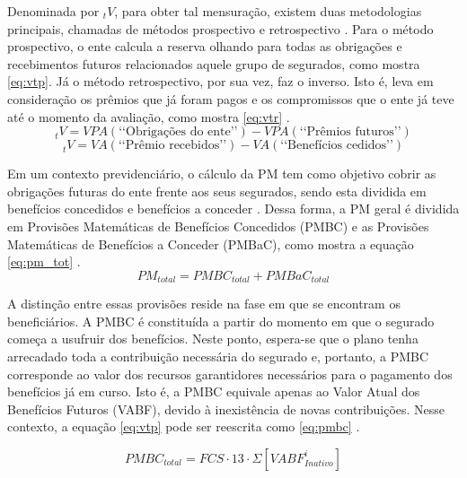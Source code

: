 Denominada por ${}_tV$, para obter tal mensuração, existem duas metodologias principais, chamadas de métodos prospectivo e retrospectivo \cite{cordeiro2014calculo, vilanoca1969, dickson2019}. Para o método prospectivo, o ente calcula a reserva olhando para todas as obrigações e recebimentos futuros relacionados aquele grupo de segurados, como mostra \ref{eq:vtp}. Já o método retrospectivo, por sua vez, faz o inverso. Isto é, leva em consideração os prêmios que já foram pagos e os compromissos que o ente já teve até o momento da avaliação, como mostra \ref{eq:vtr} \cite{bowers2006, jordan2003}.
\begin{equation}
    {}_tV=VPA(\text{‘‘Obrigações do ente’’})-VPA(\text{‘‘Prêmios futuros’’})
    \label{eq:vtp}
\end{equation}
\begin{equation} 
    {}_tV=VA(\text{‘‘Prêmio recebidos’’})-VA(\text{‘‘Benefícios cedidos’’})
    \label{eq:vtr} 
\end{equation}

Em um contexto previdenciário, o cálculo da PM tem como objetivo cobrir as obrigações futuras do ente frente aos seus segurados, sendo esta dividida em benefícios concedidos e benefícios a conceder \cite{chan2010, rodrigues2012risco}. Dessa forma, a PM geral é dividida em Provisões Matemáticas de Benefícios Concedidos (PMBC) e as Provisões Matemáticas de Benefícios a Conceder (PMBaC), como mostra a equação \ref{eq:pm_tot} \cite{rodrigues2012risco}.
\begin{equation} 
    PM_{total} = PMBC_{total} + PMBaC_{total}
    \label{eq:pm_tot} 
\end{equation}

A distinção entre essas provisões reside na fase em que se encontram os beneficiários. A PMBC é constituída a partir do momento em que o segurado começa a usufruir dos benefícios. Neste ponto, espera-se que o plano tenha arrecadado toda a contribuição necessária do segurado e, portanto, a PMBC corresponde ao valor dos recursos garantidores necessários para o pagamento dos benefícios já em curso. Isto é, a PMBC equivale apenas ao Valor Atual dos Benefícios Futuros (VABF), devido à inexistência de novas contribuições. Nesse contexto, a equação \ref{eq:vtp} pode ser reescrita como \ref{eq:pmbc} \cite{rodrigues2012risco, gushiken2003rpps}.

\begin{equation} 
    PMBC_{total} = FCS \cdot 13 \cdot \Sigma [VABF^{i}_{Inativo}]
    \label{eq:pmbc} 
\end{equation}

